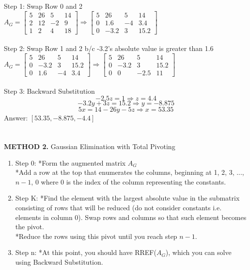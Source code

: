 \documentclass [12pt]{article}
\begin{document}
Step 1: Swap Row 0 and 2\\
$A_G = \begin{bmatrix}
5&26&5&14\\
2&12&-2&9\\
1&2&4&18
\end{bmatrix}\Rightarrow \begin{bmatrix}
5&26&5&14\\
0&1.6&-4&3.4\\
0&-3.2&3&15.2
\end{bmatrix}$\\\\
Step 2: Swap Row 1 and 2 b/c -3.2's absolute value is greater than 1.6\\
$A_G=\begin{bmatrix}
5&26&5&14\\
0&-3.2&3&15.2\\
0&1.6&-4&3.4
\end{bmatrix}\Rightarrow\begin{bmatrix}
5&26&5&14\\
0&-3.2&3&15.2\\
0&0&-2.5&11
\end{bmatrix}$\\\\
Step 3: Backward Substitution
\[-2.5z = 1\Rightarrow z= 4.4\]
\[-3.2y+3z=15.2\Rightarrow y = -8.875\]
\[5x=14-26y-5z\Rightarrow x=53.35\]
Answer: $[53.35,-8.875,-4.4]$\\\\\\
\noindent\textbf{METHOD 2.} Gaussian Elimination with Total Pivoting
\begin{enumerate}[\quad]
    \item Step 0: *Form the augmented matrix $A_G$\\
        *Add a row at the top that enumerates the columns, beginning at 1, 2, 3, ..., $n-1$, 0 where 0 is the index of the column representing the constants.
    \item Step K: *Find the element with the largest absolute value in the submatrix consisting of rows that will be reduced (do not consider constants i.e. elements in column 0). Swap rows and columns so that such element becomes the pivot.\\
    *Reduce the rows using this pivot until you reach step $n-1$.
    \item Step n: *At this point, you should have RREF($A_G$), which you can solve using Backward Substitution. 
\end{enumerate}
\end{document}
